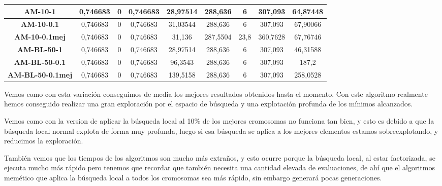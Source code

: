 \documentclass[12pt, spanish]{article}
\begin{document}
\begin{table}[H]
\begin{tabular}{|c|c|c|c|c|c|c|c|c|}
\textbf{AM-10-1}         & 0,746683                  & 0                           & 0,746683               & 28,97514   & 288,636                   & 6                           & 307,093                & 64,87448   \\ \hline
\textbf{AM-10-0.1}       & 0,746683                  & 0                           & 0,746683               & 31,03544   & 288,636                   & 6                           & 307,093                & 67,90066   \\ \hline
\textbf{AM-10-0.1mej}    & 0,746683                  & 0                           & 0,746683               & 31,136     & 287,5504                  & 23,8                        & 360,7628               & 67,76746   \\ \hline
\textbf{AM-BL-50-1}      & 0,746683                  & 0                           & 0,746683               & 28,97514   & 288,636                   & 6                           & 307,093                & 46,31588   \\ \hline
\textbf{AM-BL-50-0.1}    & 0,746683                  & 0                           & 0,746683               & 96,3543    & 288,636                   & 6                           & 307,093                & 187,2      \\ \hline
\textbf{AM-BL-50-0.1mej} & 0,746683                  & 0                           & 0,746683               & 139,5158   & 288,636                   & 6                           & 307,093                & 258,0528   \\ \hline
\end{tabular}
\end{table}


Vemos como con esta variación conseguimos de media los mejores resultados obtenidos hasta el momento. Con este algoritmo realmente hemos conseguido realizar una  gran exploración por el espacio de búsqueda y una explotación profunda de los mínimos alcanzados.

Vemos como con la version de aplicar la búsqueda local al 10\% de los mejores cromosomas no funciona tan bien, y esto es debido a que la búsqueda local normal explota de forma muy profunda, luego si esa búsqueda se aplica a los mejores elementos estamos sobreexplotando, y reducimos la exploración.

También vemos que los tiempos de los algoritmos son mucho más extraños, y esto ocurre porque la búsqueda local, al estar factorizada, se ejecuta mucho más rápido pero tenemos que recordar que también necesita una cantidad elevada de evaluaciones, de ahí que el algoritmos memético que aplica la búsqueda local a todos los cromosomas sea más rápido, sin embargo generará pocas generaciones.
\end{document}
